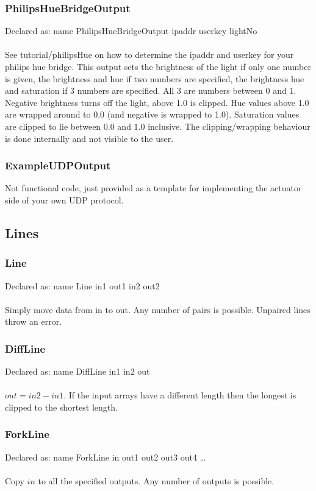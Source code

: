 \documentclass[a4paper]{article}
\begin{document}
\subsubsection{PhilipsHueBridgeOutput}
Declared as: name PhilipsHueBridgeOutput ipaddr userkey lightNo\\\\
See tutorial/philipsHue on how to determine the ipaddr and userkey for your philips hue bridge.
This output sets the brightness of the light if only one number is given, the brightness and hue if two numbers are specified, the brightness hue and saturation if 3 numbers are specified. All 3 are numbers between 0 and 1. Negative brightness turns off the light, above 1.0 is clipped. Hue values above 1.0 are wrapped around to 0.0 (and negative is wrapped to 1.0). Saturation values are clipped to lie between 0.0 and 1.0 inclusive. The clipping/wrapping behaviour is done internally and not visible to the user.
\subsubsection{ExampleUDPOutput}
Not functional code, just provided as a template for implementing the actuator side of your own UDP protocol.
\subsection{Lines}
\subsubsection{Line}
Declared as: name Line in1 out1 in2 out2\\\\
Simply move data from in to out. Any number of pairs is possible. Unpaired lines throw an error.
\subsubsection{DiffLine}
Declared as: name DiffLine in1 in2 out\\\\
$out = in2 - in1$. If the input arrays have a different length then the longest is clipped to the shortest length.
\subsubsection{ForkLine}
Declared as: name ForkLine in out1 out2 out3 out4 \ldots\\\\
Copy $in$ to all the specified outputs. Any number of outputs is possible.
\end{document}
